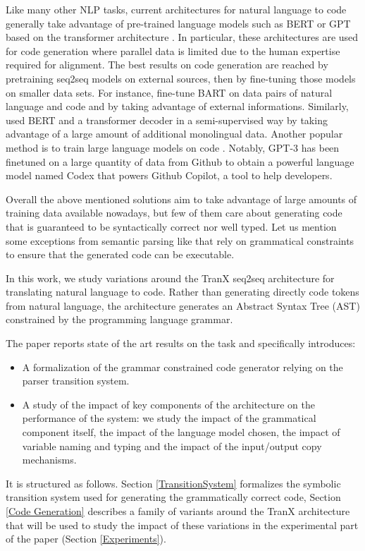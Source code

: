 \documentclass[11pt]{article}
\begin{document}
Like many other NLP tasks, current architectures for natural language to code generally take advantage  of pre-trained language models such as BERT \cite{BERT} or GPT \cite{GPT} based on the transformer architecture \cite{Transformer}.  In particular, these architectures are used for code generation where parallel data is limited due to the human expertise required for alignment. The best results on code generation are reached by pretraining seq2seq models on external sources, then by fine-tuning those models on smaller data sets. For instance, \citet{orlanski-21} fine-tune BART \cite{BART} on data pairs of natural language and code and by taking advantage of external informations. Similarly, \citet{monolingualdata} used BERT and a transformer decoder in a semi-supervised way by taking advantage of a large amount of additional monolingual data. Another popular method is to train large language models on code \cite{LLM1, APPS}. Notably, GPT-3 has been finetuned on a large quantity of data from Github to obtain a powerful language model named Codex \cite{Codex} that powers Github Copilot, a tool to help developers. 

Overall the above mentioned solutions aim to take advantage of large amounts of training data available nowadays, but few of them care about generating code that is guaranteed to be syntactically correct nor well typed. Let us mention some exceptions from semantic parsing like \citet{LSTMtree, ASN,tranx-1} that rely on grammatical constraints to ensure that the generated code can be executable. 

In this work, we study variations around the {\selectfont TranX} seq2seq architecture \citep{tranx-2018} for translating natural language to code. 
Rather than generating directly code tokens from natural language, the architecture generates an Abstract Syntax Tree (AST) constrained by the programming language grammar. 

The paper reports state of the art results on the task and specifically introduces:
\begin{itemize}
    \item A formalization of the grammar constrained code generator relying on the \citet{earley:1970} parser transition system.
    \item A study of the impact of key components of the architecture on the performance of the system: we study the impact of the grammatical component itself, the impact of the language model chosen, the impact of variable naming and typing and the impact of the input/output copy mechanisms.
\end{itemize}
It is structured as follows. Section {\ref{TransitionSystem}} formalizes the symbolic transition system used for generating the grammatically correct code, Section \ref{Code Generation} describes a family of variants around the {\selectfont TranX} architecture that will be used to study the impact of these variations in the experimental part of the paper (Section \ref{Experiments}).
\end{document}
